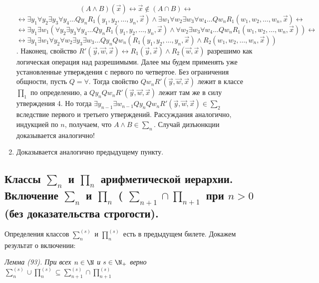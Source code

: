 \documentclass[a4paper, 10pt]{article}
\begin{document}
\begin{enumerate}
{		$$(A \land B)(\vec{x}) \leftrightarrow \vec{x} \notin (A \cap B)\leftrightarrow $$
		$$\leftrightarrow \exists y_1 \forall y_2 \exists y_3 \forall y_4 \ldots Q y_n R_1 (y_1, y_2, \ldots, y_n, \vec{x}) \land \exists w_1 \forall w_2 \exists w_3 \forall w_4 \ldots Q w_n R_1 (w_1, w_2, \ldots, w_n, \vec{x}) \leftrightarrow $$
		$$\leftrightarrow   \exists y_1 \exists w_1 (\forall y_2 \exists y_3 \forall y_4 \ldots Q y_n R_1 (y_1, y_2, \ldots, y_n, \vec{x}) \land \forall w_2 \exists w_3 \forall w_4 \ldots Q w_n R_1 (w_1, w_2, \ldots, w_n, \vec{x})) \leftrightarrow $$
		$$\leftrightarrow \exists y_1 \exists w_1 \forall y_2 \forall w_2 \exists y_3 \exists w_3 \ldots Q y_n Q w_n (R_1(y_1, y_2, \ldots, y_n, \vec{x}) \land R_2(w_1, w_2, \ldots, w_n, \vec{x}))$$.
		Наконец, свойство $R' (\vec{y}, \vec{w}, \vec{x}) \leftrightarrow R_1(\vec{y}, \vec{x}) \land R_2(\vec{w}, \vec{x})$ разрешимо как логическая операция над разрешимыми. Далее мы будем применять уже установленные утверждения с первого по четвертое. Без ограничения общности, пусть $Q = \forall$. Тогда свойство $Q w_n R' (\vec{y}, \vec{w}, \vec{x})$ лежит в классе $\prod_1$ по определению, а $Q y_n Q w_n R' (\vec{y}, \vec{w}, \vec{x})$ лежит там же в силу утверждения 4. Но тогда $\exists y_{n-1} \exists w_{n-1} Q y_n Q w_n R'(\vec{y}, \vec{w}, \vec{x}) \in \sum_2$ вследствие первого и третьего утверждений. Рассуждания аналогично, индукцией по $n$, получаем, что $A \land B \in \sum_n$.
		Случай дизъюнкции доказывается аналогично!
	}
	\item{Доказывается аналогично предыдущему пункту}.
\end{enumerate}

\subsection{Классы $\sum_n$ и $\prod_n$ арифметической иерархии. Включение $\sum_n$ и $\prod_n$ ( $\sum_{n+1} \cap \prod_{n+1}$ при $n > 0$ (без доказательства строгости).}
Определения классов $\sum_n^{(s)}$ и $\prod_n^{(s)}$ есть в предыдущем билете. Докажем результат о включении:


\textit{Лемма (93). При всех $n \in \N$ и $s \in \N_{+}$ верно $\sum_n^{(s)} \cup \prod_n^{(s)} \subseteq \sum_{n+1}^{(s)} \cap \prod_{n+1}^{(s)}$}
\end{document}
